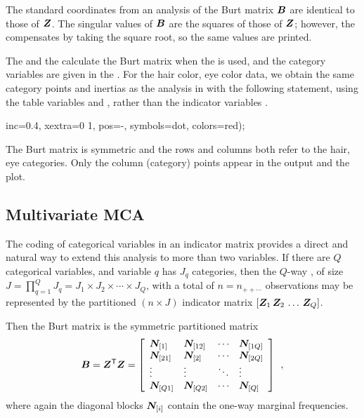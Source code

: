 The standard coordinates from an analysis of the Burt matrix
$\bm{B}$ are identical to those of $\bm{Z}$.
The singular values of $\bm{B}$ are the squares of those of $\bm{Z}$;
however, the  compensates by taking the square root,
so the same values are printed.

The  and the  calculate the
Burt matrix when the  is used, and the category
variables are given in the .
For the hair color, eye color data, we obtain the same category points
and inertias as the analysis in  with the following
statement, using the table variables  and ,
rather than the indicator variables .
\begin{listing}
   inc=0.4, xextra=0 1, pos=-, symbols=dot, colors=red);
\end{listing}
The Burt matrix is symmetric and the rows and columns both refer to
the hair, eye categories.
Only the column (category) points appear in the output and the plot.

\subsection{Multivariate MCA}\label{sec:mca-multi}
The coding of categorical variables in an indicator matrix provides
a direct and natural way to extend this analysis to more than two variables.
If there are $Q$ categorical variables, and variable $q$ has $J_q$
categories, then the $Q$-way \ctab, of size
$J = \prod_{q=1}^Q J_q = J_1 \times J_2 \times \cdots \times J_Q$,
with a total of $n = n_{++\cdots}$ observations
may be represented by the partitioned $(n \times J)$ indicator matrix
$[ \bm{Z}_1 \, \bm{Z}_2  \, \dots \, \bm{Z}_Q ]$.

Then the Burt matrix is the symmetric partitioned matrix
\begin{equation*}
 \bm{B} = \bm{Z}^\mathsf{T} \bm{Z}
 =
 \left[
 \begin{array}{llll}
 \bm{N}_{[1]} & \bm{N}_{[12]} & \cdots & \bm{N}_{[1Q]}\\
 \bm{N}_{[21]} & \bm{N}_{[2]} & \cdots & \bm{N}_{[2Q]}\\
 \vdots        & \vdots         & \ddots  & \vdots       \\
 \bm{N}_{[Q1]} & \bm{N}_{[Q2]} & \cdots & \bm{N}_{[Q]}\\
 \end{array}
 \right]
 \:\: ,
\end{equation*}
where again the diagonal blocks $\bm{N}_{[i]}$ contain the one-way
marginal frequencies.

